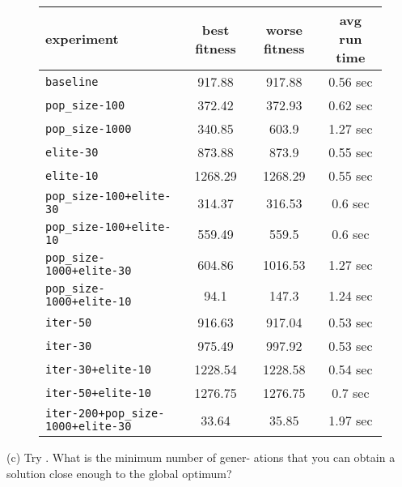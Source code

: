 \begin{figure}[htb]
	\centering
	
	\begin{tabular}{lccc}
		\toprule
		\textbf{experiment} & \textbf{best fitness} & \textbf{worse fitness} & \textbf{avg run time} \\
		\midrule
		\texttt{baseline 						}	&  917.88 &                917.88 &                 0.56 sec \\
		\texttt{pop\_size-100 					}	&  372.42 &                372.93 &                 0.62 sec \\
		\texttt{pop\_size-1000 					}	&  340.85 &                 603.9 &                 1.27 sec \\
		\texttt{elite-30 						}	&  873.88 &                 873.9 &                 0.55 sec \\
		\texttt{elite-10 						}	&  1268.29 &               1268.29 &                 0.55 sec \\
		\texttt{pop\_size-100+elite-30 			}	&  314.37 &                316.53 &                  0.6 sec \\
		\texttt{pop\_size-100+elite-10 			}	&  559.49 &                 559.5 &                  0.6 sec \\
		\texttt{pop\_size-1000+elite-30 		}	&  604.86 &               1016.53 &                 1.27 sec \\
		\texttt{pop\_size-1000+elite-10 		}	&  94.1 &                 147.3 &                 1.24 sec \\
		\texttt{iter-50 						}	&  916.63 &                917.04 &                 0.53 sec \\
		\texttt{iter-30 						}	&  975.49 &                997.92 &                 0.53 sec \\
		\texttt{iter-30+elite-10 				}	& 1228.54 &               1228.58 &                 0.54 sec \\
		\texttt{iter-50+elite-10 				}	& 1276.75 &               1276.75 &                  0.7 sec \\
		\texttt{iter-200+pop\_size-1000+elite-30} 	&   33.64 &                 35.85 &                 1.97 sec \\
		\bottomrule
	\end{tabular}
	\label{tab:cem-performance-r}
\end{figure}


(c) Try . What is the minimum number of gener- ations that you can obtain a solution close enough to the global optimum?
